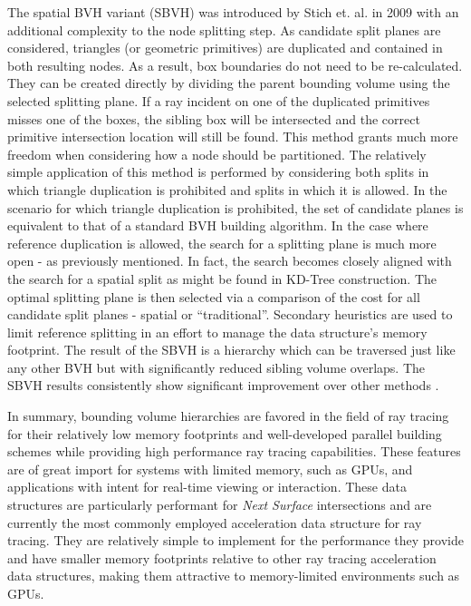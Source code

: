 The spatial BVH variant (SBVH) was introduced by Stich et. al. in 2009
\cite{Stich_2009} with an additional complexity to the node splitting step. As
candidate split planes are considered, triangles (or geometric primitives) are
duplicated and contained in both resulting nodes. As a result, box boundaries do
not need to be re-calculated. They can be created directly by dividing the
parent bounding volume using the selected splitting plane. If a ray incident on
one of the duplicated primitives misses one of the boxes, the sibling box will
be intersected and the correct primitive intersection location will still be
found. This method grants much more freedom when considering how a node should
be partitioned. The relatively simple application of this method is performed by
considering both splits in which triangle duplication is prohibited and splits
in which it is allowed. In the scenario for which triangle duplication is
prohibited, the set of candidate planes is equivalent to that of a standard BVH
building algorithm. In the case where reference duplication is allowed, the
search for a splitting plane is much more open - as previously mentioned. In
fact, the search becomes closely aligned with the search for a spatial split as
might be found in KD-Tree construction. The optimal splitting plane is then
selected via a comparison of the cost for all candidate split planes - spatial
or ``traditional''. Secondary heuristics are used to limit reference splitting
in an effort to manage the data structure's memory footprint. The result of the
SBVH is a hierarchy which can be traversed just like any other BVH but with
significantly reduced sibling volume overlaps. The SBVH results consistently
show significant improvement over other methods \cite{Stich_2009}.

In summary, bounding volume hierarchies are favored in the field of ray tracing
for their relatively low memory footprints and well-developed parallel building
schemes while providing high performance ray tracing capabilities. These
features are of great import for systems with limited memory, such as GPUs, and
applications with intent for real-time viewing or interaction. These data
structures are particularly performant for \textit{Next Surface} intersections
and are currently the most commonly employed acceleration data structure for ray
tracing. They are relatively simple to implement for the performance they
provide and have smaller memory footprints relative to other ray tracing
acceleration data structures, making them attractive to memory-limited
environments such as GPUs.


